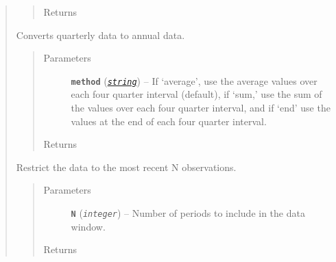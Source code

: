 \documentclass[letterpaper,10pt,english]{sphinxmanual}
\begin{document}
\begin{fulllineitems}
\begin{quote}
\begin{fulllineitems}
\begin{quote}
\begin{description}
\item[{Returns}] \leavevmode
{\hyperref[series_class:fredpy.series]{}}

\end{description}\end{quote}

\end{fulllineitems}


\begin{fulllineitems}
\label{series_class:fredpy.series.quartertoannual}
Converts quarterly data to annual data.
\begin{quote}\begin{description}
\item[{Parameters}] \leavevmode
\textbf{\texttt{method}} (\href{https://docs.python.org/2/library/string.html\#module-string}{\emph{\texttt{string}}}) -- If `average', use the average values over each four quarter interval (default), if `sum,' use the sum of the values over each four quarter interval, and if `end' use the values at the end of each four quarter interval.

\item[{Returns}] \leavevmode
{\hyperref[series_class:fredpy.series]{}}

\end{description}\end{quote}

\end{fulllineitems}


\begin{fulllineitems}
\label{series_class:fredpy.series.recent}
Restrict the data to the most recent N observations.
\begin{quote}\begin{description}
\item[{Parameters}] \leavevmode
\textbf{\texttt{N}} (\emph{\texttt{integer}}) -- Number of periods to include in the data window.

\item[{Returns}] \leavevmode
{\hyperref[series_class:fredpy.series]{}}


\end{description}
\end{quote}
\end{fulllineitems}
\end{quote}
\end{fulllineitems}
\end{document}

